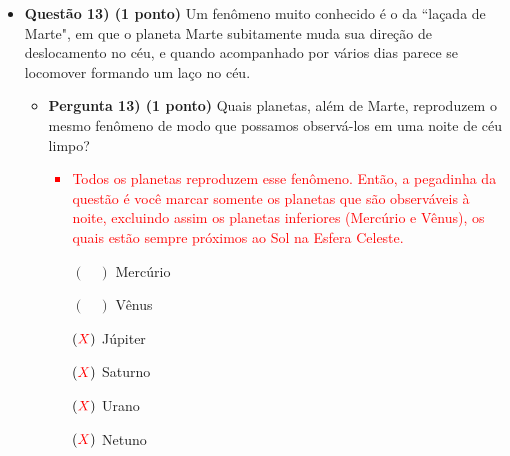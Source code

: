\documentclass[a4paper, 12pt]{article}
\newcommand{\red}[1]{\textcolor{red}{#1}}
\begin{document}
\begin{flushleft}
\begin{itemize}
            \item \textbf{Questão 13) (1 ponto)} Um fenômeno muito conhecido é o da ``laçada de Marte", em que o planeta Marte subitamente muda sua direção de deslocamento no céu, e quando acompanhado por vários dias parece se locomover formando um laço no céu.
                \begin{itemize}
                    \item \textbf{Pergunta 13) (1 ponto)} Quais planetas, além de Marte, reproduzem o mesmo fenômeno de modo que possamos observá-los em uma noite de céu limpo?
                        \red{\begin{itemize}
                            \item Todos os planetas reproduzem esse fenômeno. Então, a pegadinha da questão é você marcar somente os planetas que são observáveis à noite, excluindo assim os planetas inferiores (Mercúrio e Vênus), os quais estão sempre próximos ao Sol na Esfera Celeste.
                        \end{itemize}}
                        \begin{itemize}
                            \item[$(\quad)$] Mercúrio
                            \item[$(\quad)$] Vênus
                            \item[$(\red{X})$] Júpiter
                            \item[$(\red{X})$] Saturno
                            \item[$(\red{X})$] Urano
                            \item[$(\red{X})$] Netuno
                        \end{itemize}
                \end{itemize}
        \end{itemize} \end{flushleft}
\end{document}
